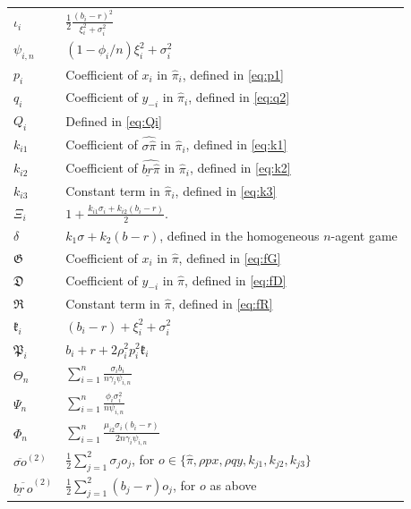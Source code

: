 \documentclass[11pt]{article}
\newenvironment{bluepar}
{\begingroup\color{blue}}
{\endgroup}
\numberwithin{equation}{section}
\providecommand{\smn}{{-}} %
\begin{document}
\begin{bluepar}
\begin{table}[htbp]
\begin{tabular}{l l}
		$\iota_i$ & $\frac{1}{2}\frac{(b_i-r)^2}{\xi_i^2+\sigma_i^2}$ \\
		$\psi_{i,n}$ & $(1-\phi_i/n)\xi_i^2+\sigma_i^2$ \\
		$p_i$ & Coefficient of $x_i$ in $\widehat{\pi}_i$, defined in \eqref{eq:p1} \\
		$q_i$ & Coefficient of $y_{\smn i}$ in $\widehat{\pi}_i$, defined in \eqref{eq:q2} \\
		$Q_i$ & Defined in \eqref{eq:Qi} \\
		$k_{i1}$ & Coefficient of $\widehat{\sigma\widehat{\pi}}$ in $\widehat{\pi}_i$, defined in \eqref{eq:k1} \\
		$k_{i2}$ & Coefficient of $\widehat{\underline{br}\widehat{\pi}}$ in $\widehat{\pi}_i$, defined in \eqref{eq:k2} \\
		$k_{i3}$ & Constant term in $\widehat{\pi}_i$, defined in \eqref{eq:k3} \\
		$\Xi_i$ & $1+\frac{k_{i1}\sigma_i+k_{i2}(b_i-r)}{2}$. \\
		$\delta$ & $k_1\sigma+k_2(b-r)$, defined in the homogeneous $n$-agent game \\
		$\mathfrak{G}$ & Coefficient of $x_i$ in $\widehat{\pi}$, defined in \eqref{eq:fG} \\
		$\mathfrak{D}$ & Coefficient of $y_{\smn i}$ in $\widehat{\pi}$, defined in \eqref{eq:fD} \\
		$\mathfrak{R}$ & Constant term in $\widehat{\pi}$, defined in \eqref{eq:fR} \\
		$\mathfrak{k}_i$ & $(b_i-r)+\xi_i^2+\sigma_i^2$ \\
		$\mathfrak{P}_i$ & $b_i+r+2\rho_i^2 p_i^2\mathfrak{k}_i$ \\
		$\Theta_n$ & $\sum_{i=1}^n\frac{\sigma_i b_i}{n\gamma_i\psi_{i,n}}$ \\
		$\Psi_n$ & $\sum_{i=1}^n\frac{\phi_i\sigma_i^2}{n\psi_{i,n}}$ \\
		$\Phi_n$ & $\sum_{i=1}^n\frac{\mu_{i2}\sigma_i(b_i-r)}{2n\gamma_i\psi_{i,n}}$ \\
		$\overline{\sigma o}^{(2)}$ & $\frac{1}{2}\sum_{j=1}^{2}\sigma_j o_j$, for $o\in\{\widehat{\pi},\rho p x, \rho q y, k_{j1}, k_{j2}, k_{j3}\}$ \\
		$\overline{\underline{br}\,o}^{(2)}$ & $\frac{1}{2}\sum_{j=1}^{2}(b_j-r)o_j$, for $o$ as above \\
		\bottomrule
	\end{tabular}
	\label{tab:notation}
\end{table}
\begin{table}[htbp]

\end{table}
\end{bluepar}
\end{document}
